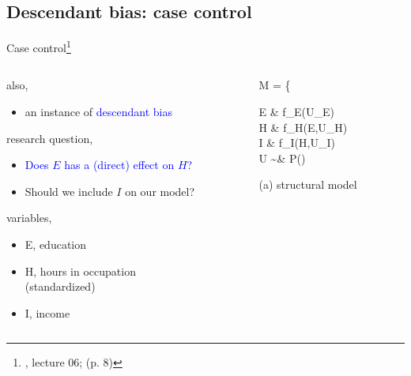 \subsection{Descendant bias: case control}
%
%
\begin{frame}[t, negative]
	\subsectionpage
\end{frame}
%
%
\begin{frame}
	{Case control\footnote{\citet{McElreath_2022}, lecture 06; \citet{Cinelli_et_al_2021} (p. 8)}}
	\begin{columns}
		\begin{column}{0.5\textwidth}
			also, 
			\begin{itemize}
				\item an instance of \textcolor{blue}{descendant bias}
			\end{itemize}
			
			research question, 
			\begin{itemize}
				\item \textcolor{blue}{Does $E$ has a (direct) effect on $H$?}
				\item Should we include $I$ on our model?
			\end{itemize}
			
			variables,
			\begin{itemize}
				\item E, education 
				\item H, hours in occupation \\
				{\small (standardized)}
				\item I, income
			\end{itemize}
		\end{column}
		\begin{column}{0.5\textwidth}  
			\begin{equ}
				M = \left\{ \begin{aligned} 
					E \leftarrow & \; f_{E}(U_{E}) \\
					H \leftarrow & \; f_{H}(E,U_{H}) \\
					I \leftarrow & \; f_{I}(H,U_{I}) \\
					U \sim & \; P()
				\end{aligned} \right
				\caption*{(a) structural model}
			\end{equ}
			\begin{figure}
\end{figure}
\end{column}
\end{columns}
\end{frame}
